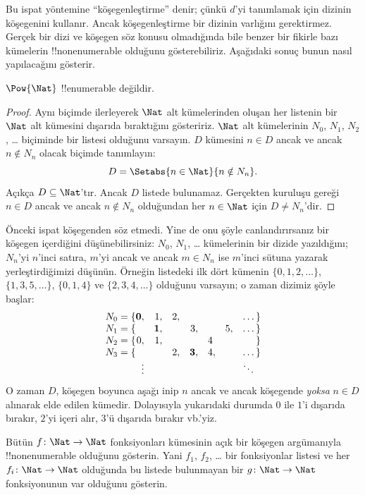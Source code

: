 \begin{explain}
Bu ispat yöntemine ``köşegenleştirme'' denir; çünkü $d$'yi tanımlamak için
dizinin köşegenini kullanır. Ancak köşegenleştirme bir dizinin varlığını
gerektirmez. Gerçek bir dizi ve köşegen söz konusu olmadığında bile benzer bir
fikirle bazı kümelerin !!{nonenumerable} olduğunu gösterebiliriz. Aşağıdaki
sonuç bunun nasıl yapılacağını gösterir.
\end{explain}

\begin{thm}
$\Pow{\Nat}$ !!{enumerable} değildir.
\end{thm}

\begin{proof}
Aynı biçimde ilerleyerek $\Nat$ alt kümelerinden oluşan her listenin bir
$\Nat$ alt kümesini dışarıda bıraktığını gösteririz. $\Nat$ alt kümelerinin
$N_0$, $N_1$, $N_2$, \ldots{} biçiminde bir listesi olduğunu varsayın. $D$
kümesini $n\in D$ ancak ve ancak $n\notin N_n$ olacak biçimde tanımlayın:
\[
D = \Setabs{n \in \Nat}{n \notin N_n}.
\]
Açıkça $D\subseteq\Nat$'tır. Ancak $D$ listede bulunamaz. Gerçekten kuruluşu
gereği $n\in D$ ancak ve ancak $n\notin N_n$ olduğundan her $n\in\Nat$ için
$D\neq N_n$'dir.
\end{proof}

\begin{explain}
Önceki ispat köşegenden söz etmedi. Yine de onu şöyle canlandırırsanız bir
köşegen içerdiğini düşünebilirsiniz: $N_0$, $N_1$, \dots{} kümelerinin bir
dizide yazıldığını; $N_n$'yi $n$'inci satıra, $m$'yi ancak ve ancak $m\in N_n$
ise $m$'inci sütuna yazarak yerleştirdiğimizi düşünün. Örneğin listedeki
ilk dört kümenin $\{0,1,2,\dots\}$, $\{1,3,5,\dots\}$, $\{0,1,4\}$ ve
$\{2,3,4,\dots\}$ olduğunu varsayın; o zaman dizimiz şöyle başlar:
\[
\begin{array}{r@{}rrrrrrr}
  N_0 = \{ & \mathbf{0}, & 1, & 2, & & & & \dots\}\\
  N_1 = \{ &  & \mathbf{1}, &  & 3, &  & 5, & \dots\}\\
  N_2 = \{ & 0, & 1, &  &  & 4\phantom{,} &  & \}\\
  N_3 = \{ &  &  & 2, & \mathbf{3}, & 4, & & \dots\}\\
  &\vdots & & & & & & \ddots\phantom{\}}
  \end{array}
\]
O zaman $D$, köşegen boyunca aşağı inip $n$ ancak ve ancak köşegende
\emph{yoksa} $n\in D$ alınarak elde edilen kümedir. Dolayısıyla yukarıdaki
durumda $0$ ile $1$'i dışarıda bırakır, $2$'yi içeri alır, $3$'ü dışarıda
bırakır vb.'yiz.
\end{explain}

\begin{prob}
Bütün $f\colon\Nat\to\Nat$ fonksiyonları kümesinin açık bir köşegen
argümanıyla !!{nonenumerable} olduğunu gösterin. Yani $f_1$, $f_2$, \dots{}
bir fonksiyonlar listesi ve her $f_i\colon\Nat\to\Nat$ olduğunda bu listede
bulunmayan bir $g\colon\Nat\to\Nat$ fonksiyonunun var olduğunu gösterin.
\end{prob}

